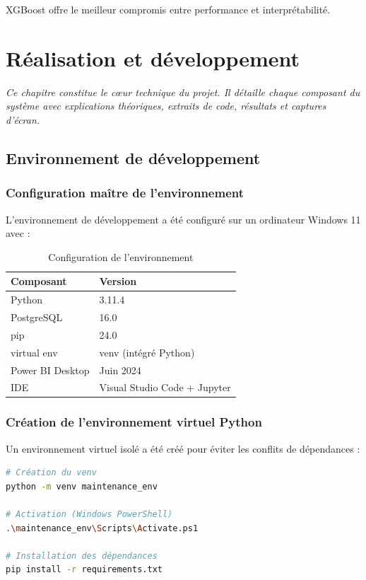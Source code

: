 \documentclass[a4paper,12pt,twoside]{report}
\begin{document}
XGBoost offre le meilleur compromis entre performance et interprétabilité.

\chapter{Réalisation et développement}

\emph{Ce chapitre constitue le cœur technique du projet. Il détaille chaque composant du système avec explications théoriques, extraits de code, résultats et captures d'écran.}

\section{Environnement de développement}

\subsection{Configuration maître de l'environnement}

L'environnement de développement a été configuré sur un ordinateur Windows 11 avec :

\begin{table}[H]
\centering
\small
\caption{Configuration de l'environnement}
\begin{tabular}{|l|l|}
\hline
\textbf{Composant} & \textbf{Version} \\
\hline\hline
Python & 3.11.4 \\
\hline
PostgreSQL & 16.0 \\
\hline
pip & 24.0 \\
\hline
virtual env & venv (intégré Python) \\
\hline
Power BI Desktop & Juin 2024 \\
\hline
IDE & Visual Studio Code + Jupyter \\
\hline
\end{tabular}
\end{table}

\subsection{Création de l'environnement virtuel Python}

Un environnement virtuel isolé a été créé pour éviter les conflits de dépendances :

\begin{lstlisting}[language=bash]
# Création du venv
python -m venv maintenance_env

# Activation (Windows PowerShell)
.\maintenance_env\Scripts\Activate.ps1

# Installation des dépendances
pip install -r requirements.txt
\end{lstlisting}
\end{document}

